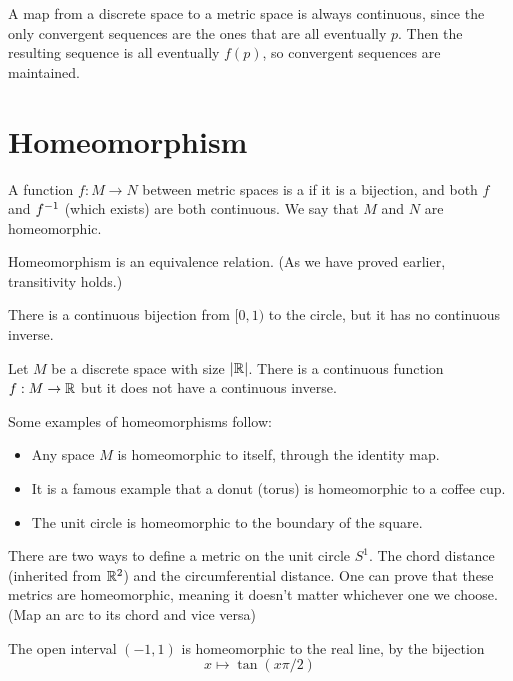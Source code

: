 \documentclass[11pt]{scrreport}
\begin{document}
\begin{remark}
    A map from a discrete space to a metric space is always continuous, since the only convergent sequences are the ones that are all eventually $p$. Then the resulting sequence is all eventually $f(p)$, so convergent sequences are maintained.
\end{remark}
\section{Homeomorphism}
\begin{definition}
    A function $f: M\to N$ between metric spaces is a  if it is a bijection, and both $f$ and $f^{-1}$ (which exists) are both continuous. We say that $M$ and $N$ are homeomorphic.
\end{definition}
Homeomorphism is an equivalence relation. (As we have proved earlier, transitivity holds.)
\begin{example}

    There is a continuous bijection from $[0,1)$ to the circle, but it has no continuous inverse.

    Let $M$ be a discrete space with size $|\mathbb R|$. There is a continuous function $f:M\to \mathbb R$ but it does not have a continuous inverse.
\end{example}
\begin{example}
    Some examples of homeomorphisms follow:
    \begin{itemize}
        \item Any space $M$ is homeomorphic to itself, through the identity map.
        \item It is a famous example that a donut (torus) is homeomorphic to a coffee cup.
        \item The unit circle is homeomorphic to the boundary of the square. 
    \end{itemize}
\end{example}
\begin{example}
    There are two ways to define a metric on the unit circle $S^1$. The chord distance (inherited from $\mathbb R^2$) and the circumferential distance. One can prove that these metrics are homeomorphic, meaning it doesn't matter whichever one we choose. (Map an arc to its chord and vice versa)
\end{example}
\begin{example}
    The open interval $(-1,1)$ is homeomorphic to the real line, by the bijection
    \[x \mapsto \tan(x\pi/2)\]
\end{example}
\end{document}
